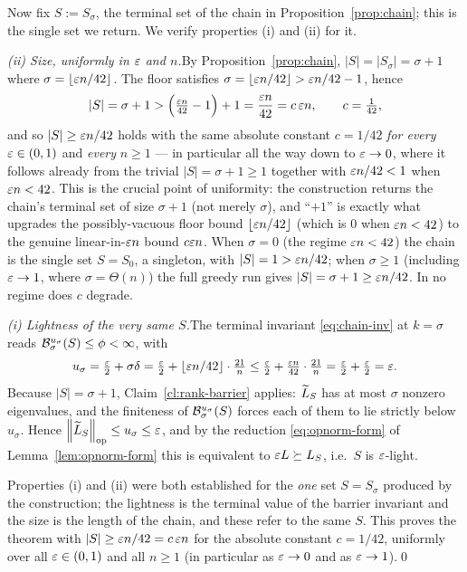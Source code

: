 Now fix $S:=S_\sigma$, the terminal set of the chain in
Proposition~\ref{prop:chain}; this is the single set we return. We verify
properties (i) and (ii) for it.

\medskip\noindent\emph{(ii) Size, uniformly in $\varepsilon$ and $n$.}\quad By
Proposition~\ref{prop:chain}, $|S|=|S_\sigma|=\sigma+1$ where
$\sigma=\lfloor\varepsilon n/42\rfloor$. The floor satisfies
$\sigma=\lfloor\varepsilon n/42\rfloor>\varepsilon n/42-1$, hence
\[
  |S|=\sigma+1>\Bigl(\tfrac{\varepsilon n}{42}-1\Bigr)+1=\frac{\varepsilon n}{42}
      =c\,\varepsilon n,\qquad c=\tfrac{1}{42},
\]
and so $|S|\ge \varepsilon n/42$ holds with the same absolute constant $c=1/42$
\emph{for every} $\varepsilon\in(0,1)$ and \emph{every} $n\ge1$ --- in particular all
the way down to $\varepsilon\to0$, where it follows already from the trivial
$|S|=\sigma+1\ge1$ together with $\varepsilon n/42<1$ when $\varepsilon n<42$. This is the
crucial point of uniformity: the construction returns the chain's terminal set of
size $\sigma+1$ (not merely $\sigma$), and ``$+1$'' is exactly what upgrades the
possibly-vacuous floor bound $\lfloor\varepsilon n/42\rfloor$ (which is $0$ when
$\varepsilon n<42$) to the genuine linear-in-$\varepsilon n$ bound $c\varepsilon n$. When
$\sigma=0$ (the regime $\varepsilon n<42$) the chain is the single set $S=S_0$, a
singleton, with $|S|=1>\varepsilon n/42$; when $\sigma\ge1$ (including $\varepsilon\to1$,
where $\sigma=\Theta(n)$) the full greedy run gives $|S|=\sigma+1\ge\varepsilon n/42$.
In no regime does $c$ degrade.

\medskip\noindent\emph{(i) Lightness of the very same $S$.}\quad The terminal
invariant \eqref{eq:chain-inv} at $k=\sigma$ reads
$\mathcal{B}^{u_\sigma}_{\sigma}(S)\le\phi<\infty$, with
\[
  u_\sigma=\tfrac{\varepsilon}{2}+\sigma\delta
          =\tfrac{\varepsilon}{2}+\lfloor\varepsilon n/42\rfloor\cdot\tfrac{21}{n}
          \le\tfrac{\varepsilon}{2}+\tfrac{\varepsilon n}{42}\cdot\tfrac{21}{n}
          =\tfrac{\varepsilon}{2}+\tfrac{\varepsilon}{2}=\varepsilon .
\]
Because $|S|=\sigma+1$, Claim~\ref{cl:rank-barrier} applies: $\widetilde{L}_S$ has at most
$\sigma$ nonzero eigenvalues, and the finiteness of
$\mathcal{B}^{u_\sigma}_{\sigma}(S)$ forces each of them to lie strictly below
$u_\sigma$. Hence $\left\lVert \widetilde{L}_S \right\rVert_{\mathrm{op}}\le u_\sigma\le\varepsilon$, and by
the reduction \eqref{eq:opnorm-form} of Lemma~\ref{lem:opnorm-form} this is
equivalent to $\varepsilon L\succeq L_S$, i.e.\ $S$ is $\varepsilon$-light.

\medskip
Properties (i) and (ii) were both established for the \emph{one} set $S=S_\sigma$
produced by the construction; the lightness is the terminal value of the barrier
invariant and the size is the length of the chain, and these refer to the same
$S$. This proves the theorem with $|S|\ge\varepsilon n/42=c\,\varepsilon n$ for the
absolute constant $c=1/42$, uniformly over all $\varepsilon\in(0,1)$ and all $n\ge1$
(in particular as $\varepsilon\to0$ and as $\varepsilon\to1$).\qed

